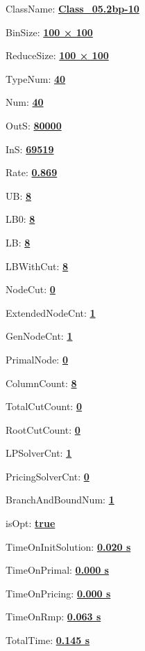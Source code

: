 \documentclass[11pt]{article}
\begin{document}
\pagestyle{empty}


ClassName: \underline{\textbf{Class_05.2bp-10}}
\par
BinSize: \underline{\textbf{100 × 100}}
\par
ReduceSize: \underline{\textbf{100 × 100}}
\par
TypeNum: \underline{\textbf{40}}
\par
Num: \underline{\textbf{40}}
\par
OutS: \underline{\textbf{80000}}
\par
InS: \underline{\textbf{69519}}
\par
Rate: \underline{\textbf{0.869}}
\par
UB: \underline{\textbf{8}}
\par
LB0: \underline{\textbf{8}}
\par
LB: \underline{\textbf{8}}
\par
LBWithCut: \underline{\textbf{8}}
\par
NodeCut: \underline{\textbf{0}}
\par
ExtendedNodeCnt: \underline{\textbf{1}}
\par
GenNodeCnt: \underline{\textbf{1}}
\par
PrimalNode: \underline{\textbf{0}}
\par
ColumnCount: \underline{\textbf{8}}
\par
TotalCutCount: \underline{\textbf{0}}
\par
RootCutCount: \underline{\textbf{0}}
\par
LPSolverCnt: \underline{\textbf{1}}
\par
PricingSolverCnt: \underline{\textbf{0}}
\par
BranchAndBoundNum: \underline{\textbf{1}}
\par
isOpt: \underline{\textbf{true}}
\par
TimeOnInitSolution: \underline{\textbf{0.020 s}}
\par
TimeOnPrimal: \underline{\textbf{0.000 s}}
\par
TimeOnPricing: \underline{\textbf{0.000 s}}
\par
TimeOnRmp: \underline{\textbf{0.063 s}}
\par
TotalTime: \underline{\textbf{0.145 s}}
\par
\newpage


\end{document}
